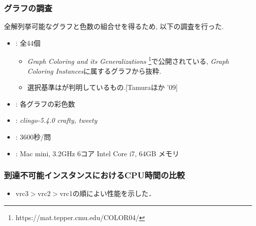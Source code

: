 
\begin{frame}\frametitle{グラフの調査}
  全解列挙可能なグラフと色数の組合せを得るため, 以下の調査を行った.
  \begin{itemize}
    \item {}: 全44個
    \begin{itemize}
      \item \textit{Graph Coloring and its Generalizations}
      \footnote{https://mat.tepper.cmu.edu/COLOR04/}で公開されている, \textit{Graph Coloring Instances}に属するグラフから抜粋.
      \item 選択基準はが判明しているもの.[Tamuraほか '09]
    \end{itemize}
    \item {}: 各グラフの彩色数

    \item {}: \textit{clingo-5.4.0} \textit{crafty, tweety}
    \item {}: 3600秒/問
    \item {}: Mac mini, 3.2GHz 6コア Intel Core i7, 64GB メモリ
  \end{itemize}
  
\end{frame}


\begin{frame}\frametitle{到達不可能インスタンスにおけるCPU時間の比較}

  \begin{table}[t]
    \centering
      
  \end{table}

  \begin{itemize}
    \item vrc3$>$vrc2$>$vrc1の順によい性能を示した．
  \end{itemize}
  
\end{frame}


